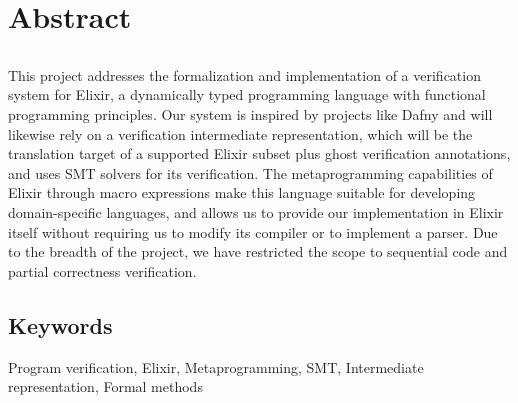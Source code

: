 \chapter*{Abstract}

\section*{\tituloPortadaEngVal}

This project addresses the formalization and implementation of a verification
system for Elixir, a dynamically typed programming language with functional
programming principles. Our system is inspired by projects like Dafny and will
likewise rely on a verification intermediate representation, which will be the
translation target of a supported Elixir subset plus ghost verification
annotations, and uses SMT solvers for its verification. The metaprogramming
capabilities of Elixir through macro expressions make this language suitable for
developing domain-specific languages, and allows us to provide our
implementation in Elixir itself without requiring us to modify its compiler or
to implement a parser. Due to the breadth of the project, we have restricted the
scope to sequential code and partial correctness verification.

\section*{Keywords}

\noindent Program verification, Elixir, Metaprogramming, SMT, Intermediate representation, Formal methods
